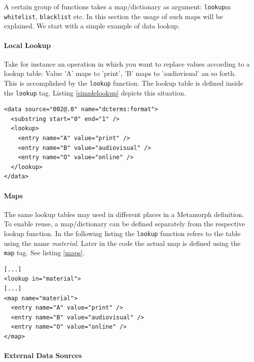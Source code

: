 \documentclass[12pt,a4paper]{article}
\begin{document}
A certain group of functions takes a map/dictionary as argument: {\tt lookup}m {\tt whitelist}, {\tt blacklist} etc.
In this section the usage of such maps will be explained. We start with a simple example of data lookup.

\paragraph{Local Lookup}

Take for instance an operation in which you want to replace values according to a lookup table: Value 'A' maps to 'print', 'B' maps to 'audiovisual' an so forth. This is accomplished by the {\tt lookup} function. The lookup table is defined inside the {\tt lookup} tag. Listing \ref{simplelookup} depicts this situation.

\begin{lstlisting}[float=htb, label=simplelookup,caption=Performing a simple lookup operation]
<data source="002@.0" name="dcterms:format">
  <substring start="0" end="1" />
  <lookup>
    <entry name="A" value="print" />
    <entry name="B" value="audiovisual" />
    <entry name="O" value="online" />
  </lookup>
</data>	
\end{lstlisting}

\paragraph{Maps}

The same lookup tables may used in different places in a Metamorph definition. To enable reuse, a map/dictionary can be defined separately from the respective lookup function. In the following listing the {\tt lookup} function refers to the table using the name {\it material}. Later in the code the actual map is defined using the {\tt map} tag. See listing \ref{maps}.

\begin{lstlisting}[float=htb, label=maps,caption={Defining a standalone map, which can be independently addressed by different lookup functions.}]
[...]
<lookup in="material">
[...]
<map name="material">
  <entry name="A" value="print" />
  <entry name="B" value="audiovisual" />
  <entry name="O" value="online" />
</map>
\end{lstlisting}

\paragraph{External Data Sources}
\end{document}
